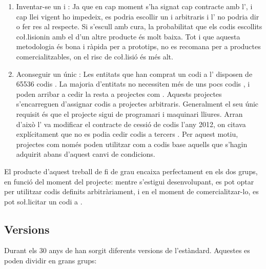 \begin{enumerate}
    \item Inventar-se un  i : Ja que en cap moment s'ha
    signat cap contracte amb l', i cap llei vigent ho impedeix, es
    podria escollir un  i  arbitraris i l' no
    podria dir o fer res al respecte. Si s'escull amb cura, la
    probabilitat que els codis escollits co\l.lisionin amb el d'un altre
    producte és molt baixa. Tot i que aquesta metodologia és bona i ràpida per a
    prototips, no es recomana per a productes comercialitzables, on el risc
    de co\l.lisió és més alt.
    \item Aconseguir un únic : Les entitats que han comprat un codi
     a l' disposen de
    \num[round-mode=places,round-precision=0]{65536} codis . La majoria
    d'entitats no necessiten més de uns pocs codis , i poden arribar
    a cedir la resta a projectes com  \cite{OpenMokoUSB}. Aquests
    projectes s'encarreguen d'assignar codis  a projectes arbitraris.
    Generalment el seu únic requisit és que el projecte sigui de programari
    i maquinari lliures. Arran d'això l' va modificar el contracte
    de cessió de codis  l'any 2012, on citava explícitament que no es
    podia cedir codis  a tercers \cite{Johnson2023usb}. Per aquest
    motiu, projectes com  només poden utilitzar com a codis
     base aquells que s'hagin adquirit abans d'aquest canvi
    de condicions.
\end{enumerate}

El producte d'aquest treball de fi de grau encaixa perfectament en els dos
grups, en funció del moment del projecte: mentre s'estigui desenvolupant, es
pot optar per utilitzar codis definits arbitràriament, i en el moment de
comercialitzar-lo, es pot so\l.licitar un codi  a .

\subsection{Versions}
\label{sec:usb_versions}

Durant els 30 anys de  han sorgit diferents versions de
l'estàndard. Aquestes es poden dividir en grans grups:

